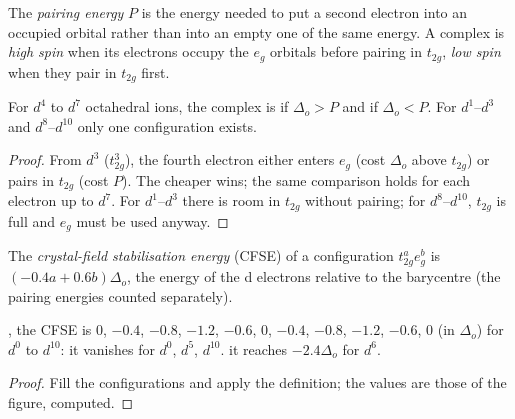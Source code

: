 \begin{definition}\label{def:b2:ligand-field:spin}
The \emph{pairing energy} $P$ is the energy needed to put a second
electron into an occupied orbital rather than into an empty one of the same energy. A
complex is \emph{high spin} when its electrons occupy the $e_g$ orbitals
before pairing in $t_{2g}$, \emph{low spin} when they pair in $t_{2g}$
first.
\end{definition}

\begin{proposition}\label{prop:b2:ligand-field:spin-state}
For $d^4$ to $d^7$ octahedral ions, the complex is  if $\Delta_o > P$ and 
if $\Delta_o < P$. For $d^1$--$d^3$ and $d^8$--$d^{10}$ only one configuration exists.
\end{proposition}

\begin{proof}
From $d^3$ ($t_{2g}^3$), the fourth electron either enters $e_g$ (cost $\Delta_o$ above
$t_{2g}$) or pairs in $t_{2g}$ (cost $P$). The cheaper wins; the same comparison holds
for each electron up to $d^7$. For $d^1$--$d^3$ there is room in $t_{2g}$ without pairing;
for $d^8$--$d^{10}$, $t_{2g}$ is full and $e_g$ must be used anyway.
\end{proof}

\begin{definition}\label{def:b2:ligand-field:cfse}
The \emph{crystal-field stabilisation energy}
(CFSE) of a configuration $t_{2g}^ae_g^b$ is $(-0.4a + 0.6b)\Delta_o$, the energy of
the d electrons relative to the barycentre (the pairing energies counted separately).
\end{definition}

\begin{proposition}\label{prop:b2:ligand-field:cfse}
, the CFSE is $0$, $-0.4$, $-0.8$, $-1.2$, $-0.6$, $0$, $-0.4$, $-0.8$, $-1.2$,
$-0.6$, $0$ (in $\Delta_o$) for $d^0$ to $d^{10}$: it vanishes for $d^0$, $d^5$, $d^{10}$.  it reaches $-2.4\Delta_o$ for $d^6$.
\end{proposition}

\begin{proof}
Fill the configurations and apply the definition; the values are those of the figure,
computed.
\end{proof}

